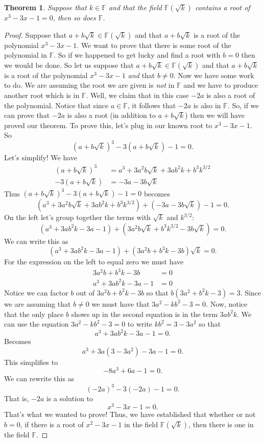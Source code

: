\documentclass[11pt]{article}
\newtheorem{theorem}{Theorem}[section]
\theoremstyle{definition}
\begin{document}
\begin{theorem}
  Suppose that $k\in\mathbb{F}$ and that the field $\mathbb{F}(\sqrt{k})$ contains a root of $x^3-3x-1=0$, then so does $\mathbb{F}$.
  \label{theorem: trisecting set up}
\end{theorem}
\begin{proof}
  Suppose that $a+b\sqrt{k}\in\mathbb{F}(\sqrt{k})$ and that $a+b\sqrt{k}$ is a root of the polynomial $x^3-3x-1$. We want to prove that
  there is some root of the polynomial in $\mathbb{F}$. So if we happened to get lucky and find a root with $b=0$ then we would be done. So let 
  us suppose that $a+b\sqrt{k}\in\mathbb{F}(\sqrt{k})$ and that $a+b\sqrt{k}$ is a root of the polynomial $x^3-3x-1$ \textit{and} that $b\neq 0$. Now
  we have some work to do. We are assuming the root we are given is \textit{not} in $\mathbb{F}$ and we have to produce another root which is
  in $\mathbb{F}$. Well, we claim that in this case $-2a$ is also a root of the polynomial. Notice that since $a\in\mathbb{F}$, it follows that
  $-2a$ is also in $\mathbb{F}$. So, if we can prove that $-2a$ is also a root (in addition to $a+b\sqrt{k}$) then we will have proved our theorem.
  To prove this, let's plug in our known root to $x^3-3x-1$. So
  \[ (a+b\sqrt{k})^3 - 3(a+b\sqrt{k}) -1 = 0.\]
  Let's simplify! We have
  \begin{align*}
  (a+b\sqrt{k})^3 &= a^3 + 3a^2b\sqrt{k} + 3ab^2k + b^3k^{3/2}\\
  -3(a+b\sqrt{k}) &= -3a-3b\sqrt{k}
  \end{align*}
  Thus $(a+b\sqrt{k})^3 - 3(a+b\sqrt{k}) -1 = 0$ becomes 
  \[ (a^3 + 3a^2b\sqrt{k} + 3ab^2k + b^3k^{3/2}) + (-3a-3b\sqrt{k}) -1 = 0.\]
  On the left let's group together the terms with $\sqrt{k}$ and $k^{3/2}$:
  \[ (a^3 + 3ab^2k -3a - 1) + (3a^2b\sqrt{k} + b^3k^{3/2}-3b\sqrt{k}) = 0.\]
  We can write this as
  \[ (a^3 + 3ab^2k -3a - 1) + (3a^2b + b^3k -3b)\sqrt{k} = 0.\]
  For the expression on the left to equal zero we must have
  \begin{align*}
    3a^2b + b^3k -3b &= 0\\
    a^3 + 3ab^2k -3a - 1 &= 0
  \end{align*}
    Notice we can factor $b$ out of $3a^2b+b^2k-3b$ so that $b(3a^2 + b^2k -3) = 3$. Since we are assuming that $b\neq 0$ we must have
    that $3a^2-kb^2-3=0$. Now, notice that the only place $b$ shows up in the second equation is in the term $3ab^2k$. We can use the
    equation $3a^2-kb^2-3=0$ to write $kb^2 = 3-3a^2$ so that
    \[ a^3 + 3ab^2k -3a - 1 = 0.\]
    Becomes
    \[ a^3 + 3a(3-3a^2) -3a - 1 = 0.\]
    This simplifies to
    \[ -8a^3 + 6a - 1 = 0.\]
    We can rewrite this as
    \[ (-2a)^3 - 3(-2a) - 1 = 0.\]
    That is, $-2a$ is a solution to 
    \[ x^3 - 3x - 1 = 0. \]
    That's what we wanted to prove! Thus, we have established that whether or not $b=0$, if there is a root of $x^2-3x-1$ in the field
    $\mathbb{F}(\sqrt{k})$, then there is one in the field $\mathbb{F}$.
\end{proof}
\end{document}
